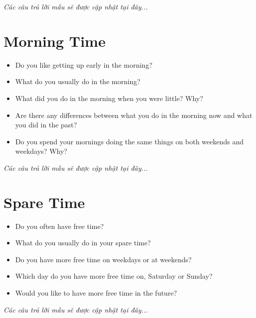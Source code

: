 \vspace{1em}
\textit{Các câu trả lời mẫu sẽ được cập nhật tại đây...}
\vspace{2em}

\section{Morning Time}
\begin{ieltsprompt}
\begin{itemize}[itemsep=4pt]
    \item Do you like getting up early in the morning?
    \item What do you usually do in the morning?
    \item What did you do in the morning when you were little? Why?
    \item Are there any differences between what you do in the morning now and what you did in the past?
    \item Do you spend your mornings doing the same things on both weekends and weekdays? Why?
\end{itemize}
\end{ieltsprompt}

\vspace{1em}
\textit{Các câu trả lời mẫu sẽ được cập nhật tại đây...}
\vspace{2em}

\section{Spare Time}
\begin{ieltsprompt}
\begin{itemize}[itemsep=4pt]
    \item Do you often have free time?
    \item What do you usually do in your spare time?
    \item Do you have more free time on weekdays or at weekends?
    \item Which day do you have more free time on, Saturday or Sunday?
    \item Would you like to have more free time in the future?
\end{itemize}
\end{ieltsprompt}

\vspace{1em}
\textit{Các câu trả lời mẫu sẽ được cập nhật tại đây...}
\vspace{2em}

